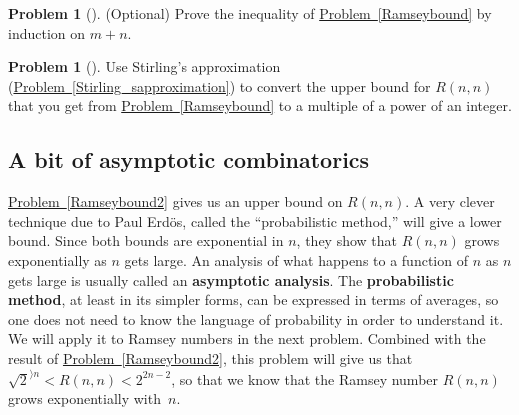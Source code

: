 \documentclass[10pt,]{book}
\newcommand{\terminology}[1]{\textbf{#1}}
\theoremstyle{plain}
\theoremstyle{definition}
\newtheorem{activity}[project]{Problem}
\theoremstyle{definition}
\numberwithin{equation}{chapter}
\newcommand{\lt}{<}
\begin{document}
\begin{activity}[]\marginsymbol[-1em]{} \label{activity-84}
(Optional) Prove the inequality of \hyperref[Ramseybound]{Problem~\ref{Ramseybound}} by induction on \(m+n\).%
\end{activity}
\begin{activity}[]\marginsymbol[-1em]{} \label{activity-85}
Use Stirling's approximation (\hyperref[Stirling_sapproximation]{Problem~\ref{Stirling_sapproximation}}) to convert the upper bound for \(R(n,n)\) that you get from \hyperref[Ramseybound]{Problem~\ref{Ramseybound}} to a multiple of a power of an integer.%
\end{activity}
\typeout{************************************************}
\typeout{************************************************}
\subsection[{A bit of asymptotic combinatorics}]{A bit of asymptotic combinatorics}\label{subsection-16}
\hyperref[Ramseybound2]{Problem~\ref{Ramseybound2}} gives us an upper bound on \(R(n,n)\). A very clever technique due to Paul Erdös, called the ``probabilistic method,'' will give a lower bound. Since both bounds are exponential in \(n\), they show that \(R(n,n)\) grows exponentially as \(n\) gets large. An analysis of what happens to a function of \(n\) as \(n\) gets large is usually called an \terminology{asymptotic analysis}. The \terminology{probabilistic method}, at least in its simpler forms, can be expressed in terms of averages, so one does not need to know the language of probability in order to understand it. We will apply it to Ramsey numbers in the next problem. Combined with the result of \hyperref[Ramseybound2]{Problem~\ref{Ramseybound2}}, this problem will give us that \(\sqrt{2}^{\rangle n}\lt R(n,n)\lt 2^{2n-2}\), so that we know that the Ramsey number \(R(n,n)\) grows exponentially with~\(n\).%
\end{document}
